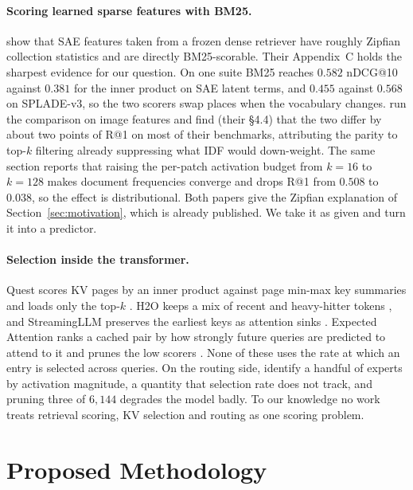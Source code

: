 \documentclass[11pt]{article}
\begin{document}
\paragraph{Scoring learned sparse features with BM25.}
\citet{clavie2026latent} show that SAE features taken from a frozen dense retriever
have roughly Zipfian collection statistics and are directly BM25-scorable. Their
Appendix~C holds the sharpest evidence for our question. On one suite BM25 reaches
$0.582$ nDCG@10 against $0.381$ for the inner product on SAE latent terms, and
$0.455$ against $0.568$ on SPLADE-v3, so the two scorers swap places when the
vocabulary changes. \citet{han2026bm25v} run the comparison on image
features and find (their \S4.4) that the two differ by about two points of R@1 on
most of their benchmarks, attributing the parity to top-$k$ filtering already
suppressing what IDF would down-weight. The same section reports that raising the per-patch activation budget
from $k{=}16$ to $k{=}128$ makes document frequencies converge and drops R@1 from
$0.508$ to $0.038$, so the effect is distributional. Both papers give the Zipfian
explanation of Section~\ref{sec:motivation}, which is already published. We take it
as given and turn it into a predictor.

\paragraph{Selection inside the transformer.} Quest scores KV pages by an inner
product against page min-max key summaries and loads only the top-$k$
\citep{tang2024quest}. H2O keeps a mix of recent and heavy-hitter tokens
\citep{zhang2023h2o}, and StreamingLLM preserves the earliest keys as attention
sinks \citep{xiao2024streamingllm}. Expected Attention ranks a cached pair by how
strongly future queries are predicted to attend to it and prunes the low scorers
\citep{devoto2025expectedattention}. None of these uses the rate at which an entry is
selected across queries. On the routing side, \citet{su2026superexperts} identify a
handful of experts by activation magnitude, a quantity that selection rate does not
track, and pruning three of $6{,}144$ degrades the model badly. To our knowledge no work treats retrieval
scoring, KV selection and routing as one scoring problem.

\section{Proposed Methodology}
\label{sec:method}
\end{document}
